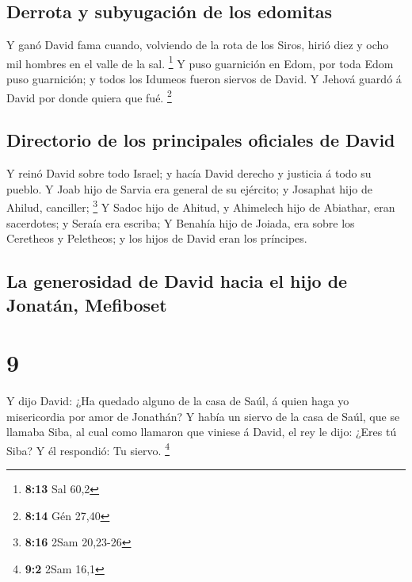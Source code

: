\hypertarget{derrota-y-subyugaciuxf3n-de-los-edomitas}{%
\subsection{Derrota y subyugación de los
edomitas}\label{derrota-y-subyugaciuxf3n-de-los-edomitas}}

 Y ganó David fama cuando, volviendo de la rota de los
Siros, hirió diez y ocho mil hombres en el valle de la sal. \footnote{\textbf{8:13}
  Sal 60,2}  Y puso guarnición en Edom, por toda Edom
puso guarnición; y todos los Idumeos fueron siervos de David. Y Jehová
guardó á David por donde quiera que fué. \footnote{\textbf{8:14} Gén
  27,40}

\hypertarget{directorio-de-los-principales-oficiales-de-david}{%
\subsection{Directorio de los principales oficiales de
David}\label{directorio-de-los-principales-oficiales-de-david}}

 Y reinó David sobre todo Israel; y hacía David derecho y
justicia á todo su pueblo.  Y Joab hijo de Sarvia era
general de su ejército; y Josaphat hijo de Ahilud, canciller;
\footnote{\textbf{8:16} 2Sam 20,23-26}  Y Sadoc hijo de
Ahitud, y Ahimelech hijo de Abiathar, eran sacerdotes; y Seraía era
escriba;  Y Benahía hijo de Joiada, era sobre los
Ceretheos y Peletheos; y los hijos de David eran los príncipes.

\hypertarget{la-generosidad-de-david-hacia-el-hijo-de-jonatuxe1n-mefiboset}{%
\subsection{La generosidad de David hacia el hijo de Jonatán,
Mefiboset}\label{la-generosidad-de-david-hacia-el-hijo-de-jonatuxe1n-mefiboset}}

\hypertarget{section-8}{%
\section{9}\label{section-8}}

 Y dijo David: ¿Ha quedado alguno de la casa de Saúl, á
quien haga yo misericordia por amor de Jonathán?  Y había
un siervo de la casa de Saúl, que se llamaba Siba, al cual como llamaron
que viniese á David, el rey le dijo: ¿Eres tú Siba? Y él respondió: Tu
siervo. \footnote{\textbf{9:2} 2Sam 16,1}

